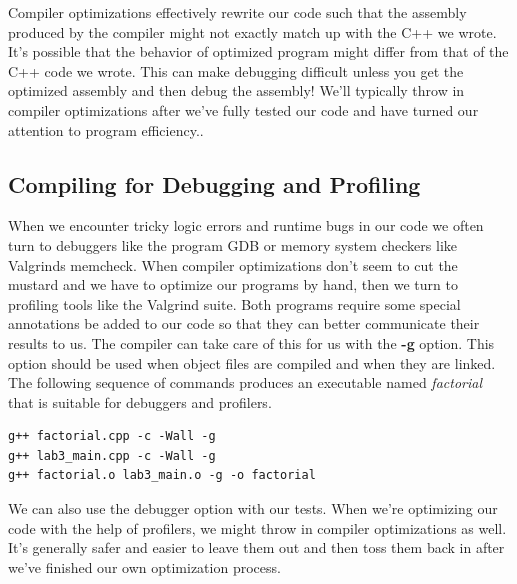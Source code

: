\documentclass[]{tufte-handout}
\begin{document}
Compiler optimizations effectively rewrite our code such that the assembly produced by the compiler might not exactly match up with the C++ we wrote.  It's possible that the behavior of optimized program might differ from that of the C++ code we wrote. This can make debugging difficult unless you get the optimized assembly and then debug the assembly! We'll typically throw in compiler optimizations after we've fully tested our code and have turned our attention to program efficiency..   


\subsection{Compiling for Debugging and Profiling}

When we encounter tricky logic errors and runtime bugs in our code we often turn to debuggers like the program GDB or memory system checkers like Valgrinds memcheck.  When compiler optimizations don't seem to cut the mustard and we have to optimize our programs by hand, then we turn to profiling tools like the Valgrind suite.  Both programs require some special annotations be added to our code so that they can better communicate their results to us. The compiler can take care of this for us with the \textbf{-g} option. This option should be used when object files are compiled and when they are linked. The following sequence of commands produces an executable named \textit{factorial} that is suitable for debuggers and profilers.   
\begin{verbatim}
g++ factorial.cpp -c -Wall -g 
g++ lab3_main.cpp -c -Wall -g
g++ factorial.o lab3_main.o -g -o factorial
\end{verbatim}
We can also use the debugger option with our tests. When we're optimizing our code with the help of profilers, we might throw in compiler optimizations as well. It's generally safer and easier to leave them out and then toss them back in after we've finished our own optimization process.
\end{document}
